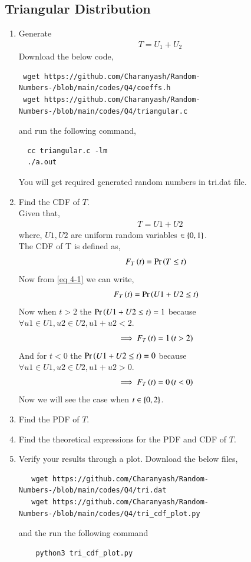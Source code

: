 \documentclass[journal,12pt,twocolumn]{IEEEtran}
\renewcommand\thesection{\arabic{section}}
\begin{document}
\begin{enumerate}[label=\thesection.\arabic*,ref=\thesection.\theenumi]
 \section{Triangular Distribution}
\begin{enumerate}[label=\thesection.\arabic*
,ref=\thesection.\theenumi]
%
\item Generate
	\begin{align}
		T = U_1+U_2
	\end{align}
\solution Download the below code,
 \begin{lstlisting}
 wget https://github.com/Charanyash/Random-Numbers-/blob/main/codes/Q4/coeffs.h
 wget https://github.com/Charanyash/Random-Numbers-/blob/main/codes/Q4/triangular.c
 \end{lstlisting}
and run the following command,
 \begin{lstlisting}
  cc triangular.c -lm
  ./a.out
 \end{lstlisting}
 You will get required generated random numbers in tri.dat file.		
\item Find the CDF of $T$.\\
 \solution Given that,
   \begin{align}
	   T = U1 + U2 \label{eq 4-1} 
   \end{align}
		where, $ U1, U2 $ are uniform random variables $\in \left\{0,1\right\}$.\\		
The CDF of T is defined as,
   \begin{align}
	    F_{T}\left(t\right) &= \Pr\left(T \leq t\right)
   \end{align}
  Now from \eqref{eq 4-1} we can write,
   \begin{align}		
	   F_{T}\left(t\right)  &= \Pr\left(U1 + U2 \leq t\right)
   \end{align}	   
  Now when $ t> 2$ the $\Pr\left( U1 + U2 \leq t\right) = 1$ because $ \forall u1\in U1,u2\in U2,u1 + u2 < 2$.
   \begin{align}
	   \implies F_{T}\left(t\right) &= 1 \left(t > 2\right)
   \end{align}
  And for $ t<0$ the $\Pr\left( U1 + U2 \leq t\right) = 0$ because $ \forall u1\in U1,u2\in U2,u1 + u2 > 0$.
   \begin{align}
	   \implies F_{T}\left(t\right) &= 0 \left(t < 0\right)
   \end{align}
  Now we will see the case when $ t \in \left\{0,2\right\} $.		
\item Find the PDF of $T$.
\item Find the theoretical expressions for the PDF and CDF of $T$.
\item Verify your results through a plot.
 \solution Download the below files,
  \begin{lstlisting}
   wget https://github.com/Charanyash/Random-Numbers-/blob/main/codes/Q4/tri.dat
   wget https://github.com/Charanyash/Random-Numbers-/blob/main/codes/Q4/tri_cdf_plot.py
  \end{lstlisting}
  and the run the following command
  \begin{lstlisting}
    python3 tri_cdf_plot.py
  \end{lstlisting}


\end{enumerate}
\end{enumerate}
\end{document}
